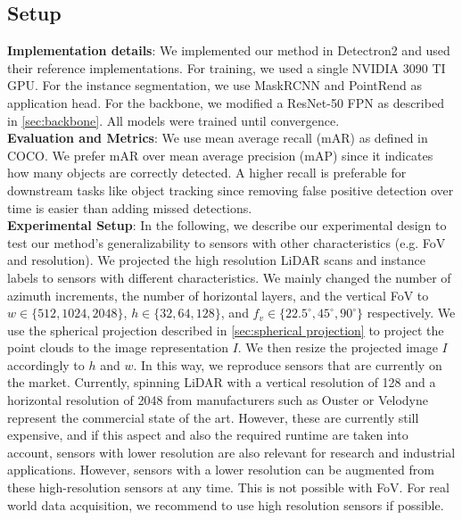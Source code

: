 \subsection{Setup}
\textbf{Implementation details}: We implemented our method in Detectron2 \cite{wu2019detectron2} and used their reference implementations. For training, we used a single NVIDIA 3090 TI GPU. For the instance segmentation, we use  MaskRCNN \cite{maskRCNN} and PointRend \cite{kirillov2019pointrend} as application head. For the backbone, we modified a ResNet-50 FPN as described in \autoref{sec:backbone}. All models were trained until convergence. 
\\

\textbf{Evaluation and Metrics}:
We use mean average recall (mAR) as defined in COCO. We prefer mAR over mean average precision (mAP) since it indicates how many objects are correctly detected. A higher recall is preferable for downstream tasks like object tracking since removing false positive detection over time is easier than adding missed detections. 
\\

\textbf{Experimental Setup}: \label{sec:experiment_B}
In the following, we describe our experimental design to test our method's generalizability to sensors with other characteristics (e.g. FoV and resolution). We projected the high resolution LiDAR scans and instance labels to sensors with different characteristics. We mainly changed the number of azimuth increments, the number of horizontal layers, and the vertical FoV to $w \in \{512,1024,2048\}$, $h \in \{32,64,128\}$, and  $f_v \in \{22.5^\circ, 45^\circ, 90^\circ\}$ respectively. We use the spherical projection described in \autoref{sec:spherical projection}  to project the point clouds to the image representation $I$. We then resize the projected image $I$ accordingly to $h$ and $w$. 
In this way, we reproduce sensors that are currently on the market. Currently, spinning LiDAR with a vertical resolution of 128 and a horizontal resolution of 2048 from manufacturers such as Ouster or Velodyne represent the commercial state of the art. However, these are currently still expensive, and if this aspect and also the required runtime are taken into account, sensors with lower resolution are also relevant for research and industrial applications. However, sensors with a lower resolution can be augmented from these high-resolution sensors at any time. This is not possible with FoV. For real world data acquisition, we recommend to use high resolution sensors if possible.

